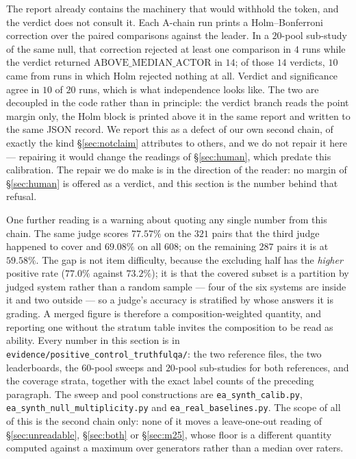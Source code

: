 \documentclass{article}
\newcommand{\ids}[1]{\texttt{\small #1}} %
\begin{document}
\begin{table}[htbp] \centering \small

\caption{The external-gold chain's operating characteristic, measured on the $357$ unambiguous pair-level items with six raters whose true accuracies differ by the stated gap. The $0$-point row is the true null. The declared threshold of $2.0$ points sits below the chain's resolution: it fires on $47\%$--$72\%$ of pools whose true gap is at most $3$ points.}
\label{tab:power}
\end{table}

The report already contains the machinery that would withhold the token, and the verdict does not consult it. Each A-chain run prints a Holm--Bonferroni correction over the paired comparisons against the leader. In a $20$-pool sub-study of the same null, that correction rejected at least one comparison in $4$ runs while the verdict returned $\mathrm{ABOVE\_MEDIAN\_ACTOR}$ in $14$; of those $14$ verdicts, $10$ came from runs in which Holm rejected nothing at all. Verdict and significance agree in $10$ of $20$ runs, which is what independence looks like. The two are decoupled in the code rather than in principle: the verdict branch reads the point margin only, the Holm block is printed above it in the same report and written to the same JSON record. We report this as a defect of our own second chain, of exactly the kind \S\ref{sec:notclaim} attributes to others, and we do not repair it here --- repairing it would change the readings of \S\ref{sec:human}, which predate this calibration. The repair we do make is in the direction of the reader: no margin of \S\ref{sec:human} is offered as a verdict, and this section is the number behind that refusal.

One further reading is a warning about quoting any single number from this chain. The same judge scores $77.57\%$ on the $321$ pairs that the third judge happened to cover and $69.08\%$ on all $608$; on the remaining $287$ pairs it is at $59.58\%$. The gap is not item difficulty, because the excluding half has the \emph{higher} positive rate ($77.0\%$ against $73.2\%$); it is that the covered subset is a partition by judged system rather than a random sample --- four of the six systems are inside it and two outside --- so a judge's accuracy is stratified by whose answers it is grading. A merged figure is therefore a composition-weighted quantity, and reporting one without the stratum table invites the composition to be read as ability. Every number in this section is in \ids{evidence/positive\_control\_truthfulqa/}: the two reference files, the two leaderboards, the $60$-pool sweeps and $20$-pool sub-studies for both references, and the coverage strata, together with the exact label counts of the preceding paragraph. The sweep and pool constructions are \ids{ea\_synth\_calib.py}, \ids{ea\_synth\_null\_multiplicity.py} and \ids{ea\_real\_baselines.py}. The scope of all of this is the second chain only: none of it moves a leave-one-out reading of \S\ref{sec:unreadable}, \S\ref{sec:both} or \S\ref{sec:m25}, whose floor is a different quantity computed against a maximum over generators rather than a median over raters.
\end{document}
